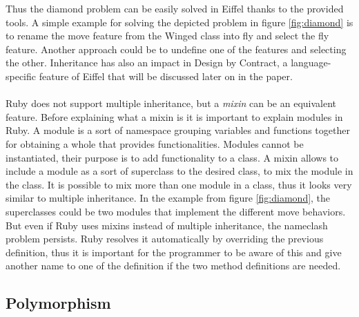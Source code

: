 \documentclass[11pt,a4paper,twocolumn]{article}
\begin{document}
Thus the diamond problem can be easily solved in Eiffel thanks to the provided tools. A simple example for solving the depicted problem in figure \ref{fig:diamond} is to rename the move feature from the Winged class into fly and select the fly feature. Another approach could be to undefine one of the features and selecting the other. Inheritance has also an impact in Design by Contract, a language-specific feature of Eiffel that will be discussed later on in the paper. 
\\
\\
Ruby does not support multiple inheritance,  but a \emph{mixin} can be an equivalent feature. Before explaining what a mixin is it is important to explain modules in Ruby. A module is a sort of namespace grouping variables and functions together for obtaining a whole that provides functionalities. Modules cannot be instantiated, their purpose is to add functionality to a class. A mixin allows to include a module as a sort of superclass to the desired class, to mix the module in the class. It is possible to mix more than one module in a class, thus it looks very similar to multiple inheritance. In the example from figure \ref{fig:diamond}, the superclasses could be two modules that implement the different move behaviors. But even if Ruby uses mixins instead of multiple inheritance, the nameclash problem persists. Ruby resolves it automatically by overriding the previous definition, thus it is important for the programmer to be aware of this and give another name to one of the definition if the two method definitions are needed.
\subsection{Polymorphism} %

\end{document}

